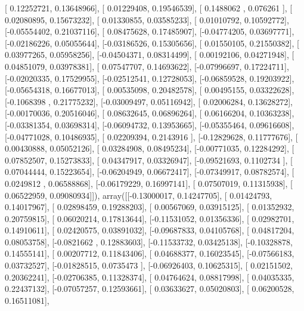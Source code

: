 \documentclass{article}
\begin{document}
       [ 0.12252721,  0.13648966],
       [ 0.01229408,  0.19546539],
       [ 0.1488062 ,  0.076261  ],
       [ 0.02080895,  0.15673232],
       [ 0.01330855,  0.03585233],
       [ 0.01010792,  0.10592772],
       [-0.05554402,  0.21037116],
       [ 0.08475628,  0.17485907],
       [-0.04774205,  0.03697771],
       [-0.02186226,  0.05055644],
       [-0.03186526,  0.15305656],
       [ 0.01550105,  0.21550382],
       [ 0.03977265,  0.05958256],
       [-0.04504371,  0.08314499],
       [ 0.00192106,  0.04271948],
       [ 0.04851079,  0.03978381],
       [ 0.07547707,  0.14693622],
       [-0.07996697,  0.17224711],
       [-0.02020335,  0.17529955],
       [-0.02512541,  0.12728053],
       [-0.06859528,  0.19203922],
       [-0.05654318,  0.16677013],
       [ 0.00535098,  0.20482578],
       [ 0.00495155,  0.03322628],
       [-0.1068398 ,  0.21775232],
       [-0.03009497,  0.05116942],
       [ 0.02006284,  0.13628272],
       [-0.00170036,  0.20516046],
       [ 0.08632645,  0.06896264],
       [ 0.06166204,  0.10363238],
       [-0.03381354,  0.03698314],
       [-0.06094732,  0.13953665],
       [-0.05355464,  0.09616608],
       [-0.04771028,  0.10486935],
       [ 0.02209394,  0.2143916 ],
       [-0.12829628,  0.11777676],
       [ 0.00430888,  0.05052126],
       [ 0.03284908,  0.08495234],
       [-0.00771035,  0.12284292],
       [ 0.07852507,  0.15273833],
       [ 0.04347917,  0.03326947],
       [-0.09521693,  0.1102734 ],
       [ 0.07044444,  0.15223654],
       [-0.06204949,  0.06672417],
       [-0.07349917,  0.08782574],
       [ 0.0249812 ,  0.06588868],
       [-0.06179229,  0.16997141],
       [ 0.07507019,  0.11315938],
       [ 0.06522959,  0.09080934]]), array([[-0.13000017,  0.14247705],
       [ 0.01424793,  0.14017967],
       [ 0.02898459,  0.19288203],
       [ 0.00567069,  0.03915125],
       [ 0.01352932,  0.20759815],
       [ 0.06020214,  0.17813644],
       [-0.11531052,  0.01356336],
       [ 0.02982701,  0.14910611],
       [ 0.02420575,  0.03891032],
       [-0.09687833,  0.04105768],
       [ 0.04817204,  0.08053758],
       [-0.0821662 ,  0.12883603],
       [-0.11533732,  0.03425138],
       [-0.10328878,  0.14555141],
       [ 0.00207712,  0.11843406],
       [ 0.04688377,  0.16023545],
       [-0.07566183,  0.03732527],
       [-0.01828515,  0.0735473 ],
       [-0.06926403,  0.10625315],
       [ 0.02151502,  0.20362241],
       [-0.02706385,  0.11328374],
       [ 0.04764624,  0.08817998],
       [ 0.04035335,  0.22437132],
       [-0.07057257,  0.12593661],
       [ 0.03633627,  0.05020803],
       [ 0.06200528,  0.16511081],
\end{document}
